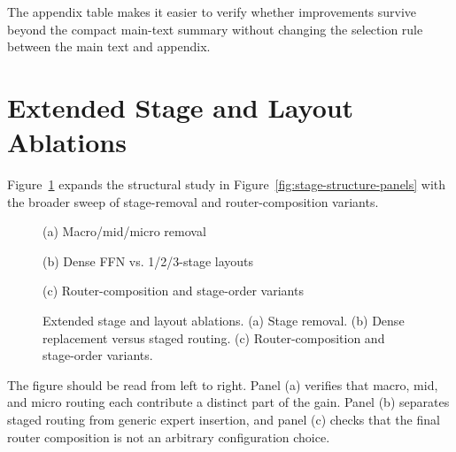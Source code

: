 \documentclass[sigconf,review,anonymous]{acmart}
\newcommand{\placeholderpanel}[1]{\fbox{\rule{0pt}{#1}\rule{0.92\linewidth}{0pt}}}
\begin{document}
The appendix table makes it easier to verify whether improvements survive beyond the compact main-text summary without changing the selection rule between the main text and appendix.

\section{Extended Stage and Layout Ablations}
\label{app:stage-layout}
Figure~\ref{fig:appendix-stage-layout} expands the structural study in Figure~\ref{fig:stage-structure-panels} with the broader sweep of stage-removal and router-composition variants.

\begin{figure}[t]
  \centering
  \begin{minipage}[t]{0.48\linewidth}
    \centering
    \placeholderpanel{1.05in}

    \vspace{0.35em}
    {\footnotesize (a) Macro/mid/micro removal}
  \end{minipage}\hfill
  \begin{minipage}[t]{0.48\linewidth}
    \centering
    \placeholderpanel{1.05in}

    \vspace{0.35em}
    {\footnotesize (b) Dense FFN vs. 1/2/3-stage layouts}

  \end{minipage}

  \vspace{0.75em}

  \begin{minipage}[t]{\linewidth}
    \centering
    \placeholderpanel{1.15in}

    \vspace{0.35em}
    {\footnotesize (c) Router-composition and stage-order variants}
  \end{minipage}
  \caption{Extended stage and layout ablations. (a) Stage removal. (b) Dense replacement versus staged routing. (c) Router-composition and stage-order variants.}
  \label{fig:appendix-stage-layout}
\end{figure}

The figure should be read from left to right. Panel (a) verifies that macro, mid, and micro routing each contribute a distinct part of the gain. Panel (b) separates staged routing from generic expert insertion, and panel (c) checks that the final router composition is not an arbitrary configuration choice.
\end{document}
